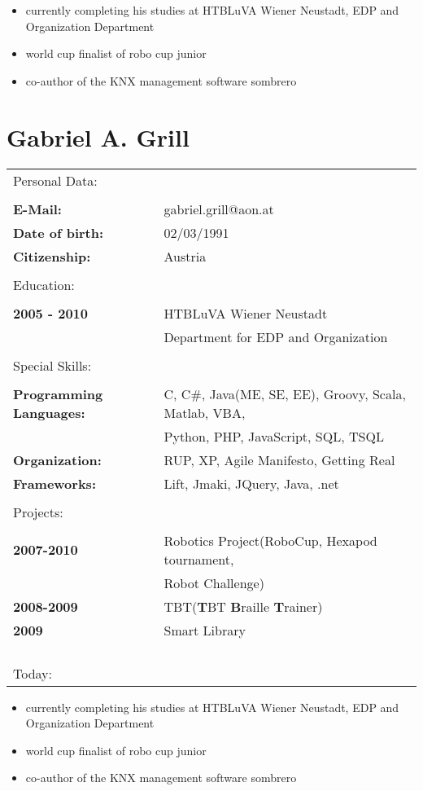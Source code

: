 \begin{itemize}
\item currently completing his studies at HTBLuVA Wiener Neustadt, EDP and Organization Department
\item world cup finalist of robo cup junior
\item co-author of the KNX management software sombrero
\end{itemize}
\clearpage
\section{Gabriel A. Grill}
\begin{tabular}{ll}
\large{Personal Data:}\\ \\
\textbf{E-Mail:}                    &       gabriel.grill@aon.at\\
\textbf{Date of birth:}             &       02/03/1991\\
\textbf{Citizenship:}               &       Austria\\
\\
\large{Education:}\\
\\
\textbf{2005 - 2010}                &       HTBLuVA Wiener Neustadt\\
                                    &       Department for EDP and Organization\\
\\
\large{Special Skills:}\\
\\
\textbf{Programming Languages:}     &       C, C\#, Java(ME, SE, EE), Groovy, Scala, Matlab, VBA,\\
                                    &       Python, PHP, JavaScript, SQL, TSQL\\
\textbf{Organization:}              &       RUP, XP, Agile Manifesto, Getting Real\\
\textbf{Frameworks:}                &       Lift, Jmaki, JQuery, Java, .net\\
\\
\large{Projects:}\\
\\
\textbf{2007-2010}                  &       Robotics Project(RoboCup, Hexapod tournament,\\
                                    &       Robot Challenge)\\
\textbf{2008-2009}                  &       TBT(\textbf{T}BT \textbf{B}raille \textbf{T}rainer)\\
\textbf{2009}                       &       Smart Library\\
\\ \\ \\ \\
\large{Today:}\\
\end{tabular}

\begin{itemize}
\item currently completing his studies at HTBLuVA Wiener Neustadt, EDP and Organization Department
\item world cup finalist of robo cup junior
\item co-author of the KNX management software sombrero

\end{itemize}
